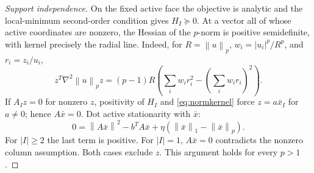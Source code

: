 \documentclass[11pt]{article}
\newcommand{\norm}[1]{\left\lVert#1\right\rVert}
\theoremstyle{remark}\newtheorem{remark}[theorem]{Remark}
\begin{document}
\begin{proof}[Support independence]
On the fixed active face the objective is analytic and the local-minimum
second-order condition gives $H_I\succeq0$. At a vector all of whose
active coordinates are nonzero, the Hessian of the $p$-norm is positive
semidefinite, with kernel precisely the radial line. Indeed, for
$R=\norm{u}_p$, $w_i=|u_i|^p/R^p$, and $r_i=z_i/u_i$,
\begin{equation}\label{eq:normkernel}
 z^T\nabla^2\norm{u}_p z
 =(p-1)R\left(\sum_iw_i r_i^2-
                    \left(\sum_iw_i r_i\right)^2\right).
\end{equation}
If $A_Iz=0$ for nonzero $z$, positivity of $H_I$ and
\eqref{eq:normkernel} force $z=a\bar x_I$ for $a\ne0$; hence
$A\bar x=0$. Dot active stationarity with $\bar x$:
\begin{equation}\label{eq:radialcompat}
 0=\norm{A\bar x}^2-b^TA\bar x+
                 \eta(\norm{\bar x}_1-\norm{\bar x}_p).
\end{equation}
For $|I|\ge2$ the last term is positive. For $|I|=1$,
$A\bar x=0$ contradicts the nonzero column assumption. Both cases
exclude $z$. This argument holds for every $p>1$.
\end{proof}
\end{document}
